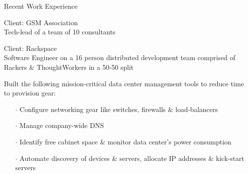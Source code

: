 \documentclass{resume} %
\begin{document}
\begin{rSection}{Recent Work Experience}
\begin{rSubsection}{}{}{}{}{Client: GSM Association\\Tech-lead of a team of 10 consultants}
\end{rSubsection}\vspace{-1em}



\begin{rSubsection}{}{}{}{}
{Client: Rackspace\\Software Engineer on a 16 person distributed development team comprised of Rackers \& ThoughtWorkers in a 50-50 split}

\item Built the following mission-critical data center management tools to reduce time to provision gear:
\vspace{-0.5em}
\begin{itemize}  \itemsep0.5pt \parskip0pt
    \item[$\cdot$] Configure networking gear like switches, firewalls \& load-balancers
    \item[$\cdot$] Manage company-wide DNS
    \item[$\cdot$] Identify free cabinet space \& monitor data center's power consumption
    \item[$\cdot$] Automate discovery of devices \& servers, allocate IP addresses \& kick-start servers
\end{itemize}

\end{rSubsection}








\end{rSection}
\end{document}
